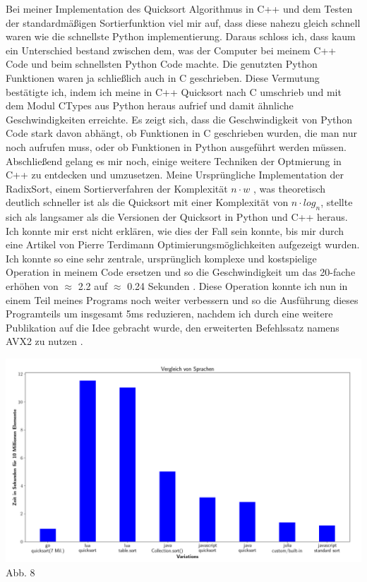 \documentclass[12pt,a4paper]{article}
\begin{document}
Bei meiner Implementation des Quicksort Algorithmus in C++ und dem Testen der standardmäßigen Sortierfunktion
viel mir auf, dass diese nahezu gleich schnell waren wie die schnellste Python implementierung.
Daraus schloss ich, dass kaum ein Unterschied bestand zwischen dem, was der Computer bei meinem C++ Code und beim schnellsten Python Code machte.
Die genutzten Python Funktionen waren ja schließlich auch in C geschrieben. Diese Vermutung bestätigte ich, indem
ich meine in C++ Quicksort nach C umschrieb und mit dem Modul CTypes aus Python heraus aufrief und damit ähnliche Geschwindigkeiten
erreichte. Es zeigt sich, dass die Geschwindigkeit von Python Code stark davon abhängt, ob Funktionen in C geschrieben wurden,
die man nur noch aufrufen muss, oder ob Funktionen in Python ausgeführt werden müssen.
Abschließend gelang es mir noch, einige weitere Techniken der Optmierung in C++ zu entdecken und umzusetzen.
Meine Ursprüngliche Implementation der RadixSort, einem Sortierverfahren der Komplexität $n \cdot w$ , was theoretisch deutlich schneller ist als die Quicksort
mit einer Komplexität von $n \cdot log_{n}$, stellte sich als langsamer als die Versionen  der Quicksort in Python und C++ heraus.
Ich konnte mir erst nicht erklären, wie dies der Fall sein konnte, bis mir durch eine Artikel von Pierre Terdimann Optimierungsmöglichkeiten
aufgezeigt wurden. Ich konnte so eine sehr zentrale, ursprünglich komplexe und kostspielige Operation in meinem Code ersetzen
und so die Geschwindigkeit um das 20-fache erhöhen von $\approx$ 2.2 auf $\approx$ 0.24 Sekunden \cite{terdiman}.
Diese Operation konnte ich nun in einem Teil meines Programs noch weiter verbessern und so die Ausführung dieses Programteils
um insgesamt 5ms reduzieren, nachdem ich durch eine weitere Publikation auf die Idee gebracht wurde, den erweiterten Befehlssatz namens
AVX2 zu nutzen \cite{michael}.

  \cite{intelavxdocs} 


\begin{center}
    \hspace*{-1.5cm}\includegraphics[width=1.2\textwidth]{./diagramme/matplotlib/comparison.png}
    Abb. 8
\end{center}
\end{document}
